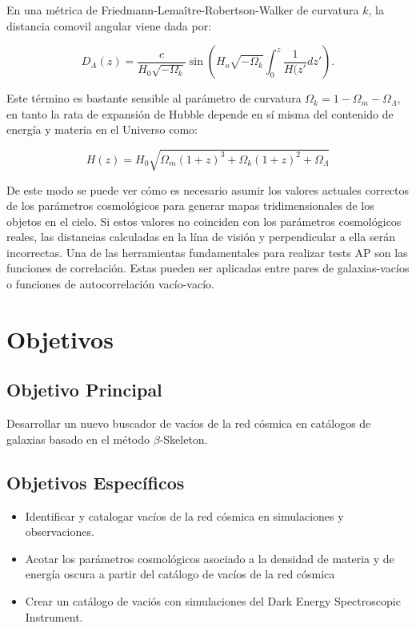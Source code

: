 \documentclass[preprint]{aastex62}
\begin{document}
  En una métrica de  Friedmann-Lema\^itre-Robertson-Walker de curvatura $k$, la distancia
  comovil angular viene dada por:
  
  \begin{equation}
    D_A(z) = \frac{c}{H_0\sqrt{-\Omega_k}} \sin \left( H_o\sqrt{-\Omega_k}
    \int_0^z \frac{1}{H(z'} dz' \right).
  \end{equation}
  
  Este término es bastante sensible al parámetro de curvatura
  $\Omega_k = 1 - \Omega_m - \Omega_\Lambda$, en tanto la rata de expansión de Hubble
  depende en sí misma del contenido de energía y materia en el Universo como:

  \begin{equation}
    H(z) = H_0 \sqrt{ \Omega_m(1+z)^3 + \Omega_k(1+z)^2+\Omega_\Lambda}
  \end{equation}

  De este modo se puede ver cómo es necesario asumir los valores actuales correctos de los
  parámetros cosmológicos para generar mapas tridimensionales de los objetos en el cielo. Si
  estos valores no coinciden con los parámetros
  cosmológicos reales, las distancias calculadas  en la lína de visión y perpendicular a ella serán
  incorrectas. Una de las herramientas fundamentales para realizar tests AP son las funciones
  de correlación. Estas pueden ser aplicadas entre pares de galaxias-vacíos o funciones de
  autocorrelación vacío-vacío.
  

  
  \section{Objetivos}

  \subsection{Objetivo Principal}
  Desarrollar un nuevo buscador de vacíos de la red cósmica en catálogos de galaxias
  basado en el método $\beta$-Skeleton.
  
  \subsection{Objetivos Específicos}

  \begin{itemize}    
      \item Identificar y catalogar vacíos de la red cósmica en
        simulaciones y observaciones.
      \item Acotar los parámetros cosmológicos asociado a la densidad
        de materia y de energía oscura a partir del catálogo de
        vacíos de la red cósmica
    \item  Crear un cat\'alogo de vaci\'os con simulaciones del Dark
      Energy Spectroscopic Instrument.
  \end{itemize}
  
\end{document}
